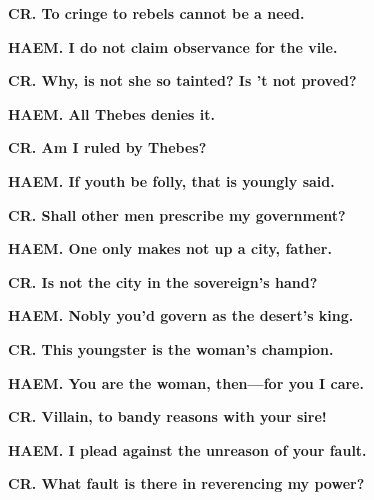\documentclass[11pt,letter]{book}
\begin{document}
\par \textbf{CR. To cringe to rebels cannot be a need.}
\par 

\par \textbf{HAEM. I do not claim observance for the vile.}
\par 

\par \textbf{CR. Why, is not she so tainted? Is ’t not proved?}
\par 

\par \textbf{HAEM. All Thebes denies it.}
\par 

\par \textbf{CR. Am I ruled by Thebes?}
\par 

\par \textbf{HAEM. If youth be folly, that is youngly said.}
\par 

\par \textbf{CR. Shall other men prescribe my government?}
\par 

\par \textbf{HAEM. One only makes not up a city, father.}
\par 

\par \textbf{CR. Is not the city in the sovereign’s hand?}
\par 

\par \textbf{HAEM. Nobly you’d govern as the desert’s king.}
\par 

\par \textbf{CR. This youngster is the woman’s champion.}
\par 

\par \textbf{HAEM. You are the woman, then—for you I care.}
\par 

\par \textbf{CR. Villain, to bandy reasons with your sire!}
\par 

\par \textbf{HAEM. I plead against the unreason of your fault.}
\par 

\par \textbf{CR. What fault is there in reverencing my power?}
\par 
\end{document}
